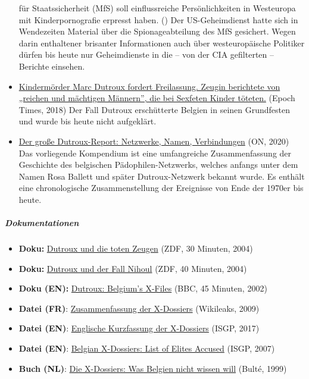 \begin{itemize}
  für Staatssicherheit (MfS) soll einflussreiche Persönlichkeiten in
  Westeuropa mit Kinderpornografie erpresst haben. () Der
  US-Geheimdienst hatte sich in Wendezeiten Material über die
  Spionageabteilung des MfS gesichert. Wegen darin enthaltener brisanter
  Informationen auch über westeuropäische Politiker dürfen bis heute nur
  Geheimdienste in die -- von der CIA gefilterten -- Berichte einsehen.
\item
  \href{https://www.epochtimes.de/politik/europa/kindermoerder-marc-dutroux-fordert-freilassung-zeugin-berichtete-von-reichen-und-maechtigen-maennern-die-bei-sexfeten-kinder-toeteten-a2609842.html}{Kindermörder
  Marc Dutroux fordert Freilassung. Zeugin berichtete von „reichen und
  mächtigen Männern'', die bei Sexfeten Kinder töteten.} (Epoch Times,
  2018) Der Fall Dutroux erschütterte Belgien in seinen Grundfesten und
  wurde bis heute nicht aufgeklärt.
\item
  \href{https://olivernevermind.wordpress.com/2020/02/02/der-grosse-dutroux-report-netzwerke-namen-verbindungen/}{Der
  große Dutroux-Report: Netzwerke, Namen, Verbindungen} (ON, 2020) Das
  vorliegende Kompendium ist eine umfangreiche Zusammenfassung der
  Geschichte des belgischen Pädophilen-Netzwerks, welches anfangs unter
  dem Namen Rosa Ballett und später Dutroux-Netzwerk bekannt wurde. Es
  enthält eine chronologische Zusammenstellung der Ereignisse von Ende
  der 1970er bis heute.
\end{itemize}

\hypertarget{dokumentationen}{%
\subparagraph{\texorpdfstring{\textbf{Dokumentationen}}{Dokumentationen}}\label{dokumentationen}}

\begin{itemize}
\tightlist
\item
  \textbf{Doku:}
  \href{https://www.youtube.com/watch?v=sAYOBX7B1Hk}{Dutroux und die
  toten Zeugen} (ZDF, 30 Minuten, 2004)
\item
  \textbf{Doku:}
  \href{https://www.youtube.com/watch?v=fxJjwzziSaY}{Dutroux und der
  Fall Nihoul} (ZDF, 40 Minuten, 2004)
\item
  \textbf{Doku (EN):}
  \href{https://www.youtube.com/watch?v=Ar0DB7qhI7c}{Dutroux: Belgium's
  X-Files} (BBC, 45 Minuten, 2002)
\item
  \textbf{Datei (FR)}:
  \href{https://wikileaks.org/wiki/Belgium:_Dutroux_dossier_summary,_1235_pages,_2005}{Zusammenfassung
  der X-Dossiers} (Wikileaks, 2009)
\item
  \textbf{Datei (EN)}: \href{https://archive.vn/oOwJf}{Englische
  Kurzfassung der X-Dossiers} (ISGP, 2017)
\item
  \textbf{Datei (EN)}:
  \href{https://www.pdf-archive.com/2020/07/18/dutroux-x-dossiers-accused-overview-2007-isgp/dutroux-x-dossiers-accused-overview-2007-isgp.pdf}{Belgian
  X-Dossiers: List of Elites Accused} (ISGP, 2007)
\item
  \textbf{Buch (NL)}:
  \href{https://archive.org/details/XDossiersDe-WatBelgieNietMochtWetenOverDeZaakDutrouxAnnemieBulteDouglasDeConinck}{Die
  X-Dossiers: Was Belgien nicht wissen will} (Bulté, 1999)
\end{itemize}


